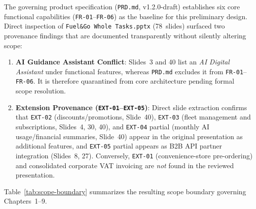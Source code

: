 The governing product specification (\texttt{PRD.md}, v1.2.0-draft) establishes six core functional capabilities (\texttt{FR-01}--\texttt{FR-06}) as the baseline for this preliminary design. Direct inspection of \texttt{Fuel\&Go Whole Tasks.pptx} (78~slides) surfaced two provenance findings that are documented transparently without silently altering scope:
\begin{enumerate}[leftmargin=1.4em, itemsep=2pt]
  \item \textbf{AI Guidance Assistant Conflict}: Slides~3 and 40 list an \emph{AI Digital Assistant} under functional features, whereas \texttt{PRD.md} excludes it from \texttt{FR-01}--\texttt{FR-06}. It is therefore quarantined from core architecture pending formal scope resolution.
  \item \textbf{Extension Provenance (\texttt{EXT-01}--\texttt{EXT-05})}: Direct slide extraction confirms that \texttt{EXT-02} (discounts/promotions, Slide~40), \texttt{EXT-03} (fleet management and subscriptions, Slides~4, 30, 40), and \texttt{EXT-04} partial (monthly AI usage/financial summaries, Slide~40) appear in the original presentation as additional features, and \texttt{EXT-05} partial appears as B2B API partner integration (Slides~8, 27). Conversely, \texttt{EXT-01} (convenience-store pre-ordering) and consolidated corporate VAT invoicing are \emph{not} found in the reviewed presentation.
\end{enumerate}

Table~\ref{tab:scope-boundary} summarizes the resulting scope boundary governing Chapters~1--9.

